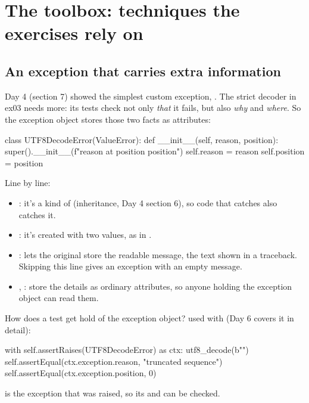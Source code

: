 \documentclass[10pt,a4paper]{article}
\begin{document}
\section{The toolbox: techniques the exercises rely on}
\subsection{An exception that carries extra information}
Day 4 (section 7) showed the simplest custom exception, . The strict decoder in ex03 needs more: its tests check not only \emph{that} it fails, but also \emph{why} and \emph{where}. So the exception object stores those two facts as attributes:
\begin{pycode}
class UTF8DecodeError(ValueError):
    def __init__(self, reason, position):
        super().__init__(f"{reason} at position {position}")
        self.reason = reason
        self.position = position
\end{pycode}
Line by line:
\begin{itemize}
\item {}: it’s a kind of  (inheritance, Day 4 section 6), so code that catches  also catches it.
\item {}: it’s created with two values, as in .
\item {}: lets the original  store the readable message, the text shown in a traceback. Skipping this line gives an exception with an empty message.
\item {}, : store the details as ordinary attributes, so anyone holding the exception object can read them.
\end{itemize}
How does a test get hold of the exception object?  used with  (Day 6 covers it in detail):
\begin{pycode}
with self.assertRaises(UTF8DecodeError) as ctx:
    utf8_decode(b"")
self.assertEqual(ctx.exception.reason, "truncated sequence")
self.assertEqual(ctx.exception.position, 0)
\end{pycode}
 is the exception that was raised, so its  and  can be checked.
\end{document}
